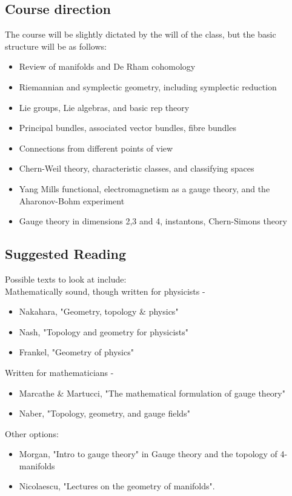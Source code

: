 \documentclass{article}
\begin{document}
\subsection{Course direction}
The course will be slightly dictated by the will of the class, but the basic structure will be as follows:
\begin{itemize}
    \item Review of manifolds and De Rham cohomology
    \item Riemannian and symplectic geometry, including symplectic reduction
    \item Lie groups, Lie algebras, and basic rep theory
    \item Principal bundles, associated vector bundles, fibre bundles
    \item Connections from different points of view 
    \item Chern-Weil theory, characteristic classes, and classifying spaces
    \item Yang Mills functional, electromagnetism as a gauge theory, and the Aharonov-Bohm experiment
    \item Gauge theory in dimensions 2,3 and 4, instantons, Chern-Simons theory
\end{itemize}
\subsection{Suggested Reading}
Possible texts to look at include: \\
Mathematically sound, though written for physicists - 
\begin{itemize}
    \item Nakahara, "Geometry, topology \& physics" 
    \item Nash, "Topology and geometry for physicists" 
    \item Frankel, "Geometry of physics" 
\end{itemize}
Written for mathematicians - 
\begin{itemize}
    \item Marcathe \& Martucci, "The mathematical formulation of gauge theory"
    \item Naber, "Topology, geometry, and gauge fields"
\end{itemize}
Other options:
\begin{itemize}
	\item Morgan, "Intro to gauge theory" in Gauge theory and the topology of 4-manifolds
	\item Nicolaescu, "Lectures on the geometry of manifolds". 
\end{itemize}
\end{document}
